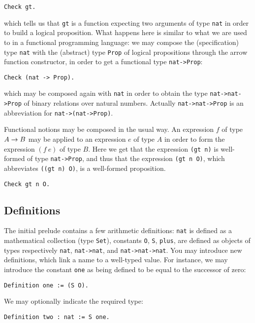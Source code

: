 \documentclass{book}
\begin{document}
\begin{lstlisting}
Check gt.
\end{lstlisting}

which tells us that \verb:gt: is a function expecting two arguments of
type \verb:nat: in order to build a logical proposition.
What happens here is similar to what we are used to in a functional
programming language: we may compose the (specification) type \verb:nat:
with the (abstract) type \verb:Prop: of logical propositions through the
arrow function constructor, in order to get a functional type
\verb:nat->Prop::
\begin{lstlisting}
Check (nat -> Prop).
\end{lstlisting}
which may be composed again with \verb:nat: in order to obtain the
type \verb:nat->nat->Prop: of binary relations over natural numbers.
Actually \verb:nat->nat->Prop: is an abbreviation for 
\verb:nat->(nat->Prop):. 

Functional notions may be composed in the usual way. An expression $f$
of type $A\rightarrow B$ may be applied to an expression $e$ of type $A$ in order
to form the expression $(f~e)$ of type $B$. Here we get that
the expression \verb:(gt n): is well-formed of type \verb:nat->Prop:,
and thus that the expression \verb:(gt n O):, which abbreviates
\verb:((gt n) O):, is a well-formed proposition.
\begin{lstlisting}
Check gt n O.
\end{lstlisting}

\subsection{Definitions}

The initial prelude contains a few arithmetic definitions:
\verb:nat: is defined as a mathematical collection (type \verb:Set:), constants
\verb:O:, \verb:S:, \verb:plus:, are defined as objects of types
respectively \verb:nat:, \verb:nat->nat:, and \verb:nat->nat->nat:.
You may introduce new definitions, which link a name to a well-typed value.
For instance, we may introduce the constant \verb:one: as being defined
to be equal to the successor of zero:
\begin{lstlisting}
Definition one := (S O).
\end{lstlisting}
We may optionally indicate the required type:
\begin{lstlisting}
Definition two : nat := S one.
\end{lstlisting}
\end{document}
